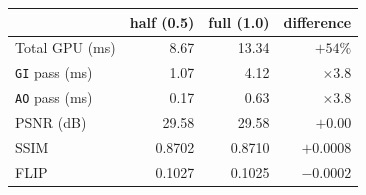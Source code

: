 \begin{tabular}{lrrr}
\toprule
 & half (0.5) & full (1.0) & difference \\
\midrule
Total GPU (ms) & 8.67 & 13.34 & $+54\%$ \\
\texttt{GI} pass (ms) & 1.07 & 4.12 & $\times 3.8$ \\
\texttt{AO} pass (ms) & 0.17 & 0.63 & $\times 3.8$ \\
\midrule
PSNR (dB) & 29.58 & 29.58 & $+0.00$ \\
SSIM & 0.8702 & 0.8710 & $+0.0008$ \\
FLIP & 0.1027 & 0.1025 & $-0.0002$ \\
\bottomrule
\end{tabular}
